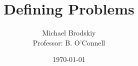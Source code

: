 


\title{Defining Problems}
\date{\today}
\author{Michael Brodskiy\\ \small Professor: B. O'Connell}



\maketitle

